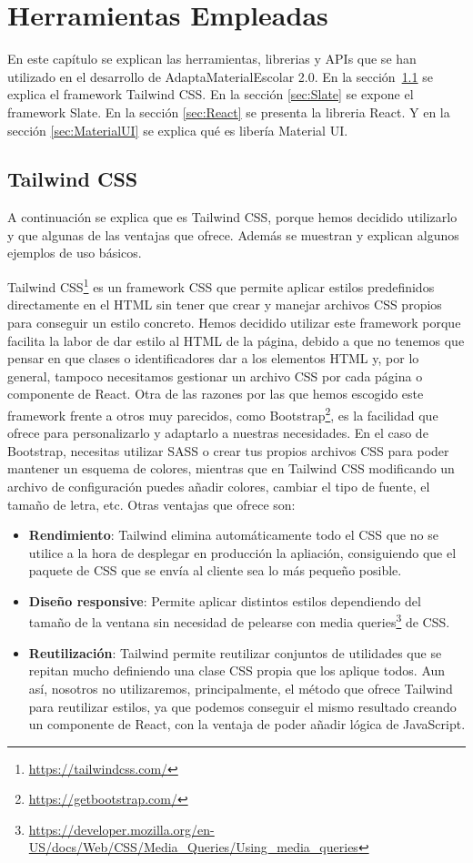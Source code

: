 \chapter{Herramientas Empleadas}\label{ch:herramientas}

En este capítulo se explican las herramientas, librerias y APIs que se han utilizado en el desarrollo de AdaptaMaterialEscolar 2.0. En la sección~\ref{sec:tailwind} se explica el framework Tailwind CSS. En la sección \ref{sec:Slate} se expone el framework Slate. En la sección \ref{sec:React} se presenta la libreria React. Y en la sección \ref{sec:MaterialUI} se explica qué es libería Material UI.

\section{Tailwind CSS}\label{sec:tailwind}
A continuación se explica que es Tailwind CSS, porque hemos decidido utilizarlo y que algunas de las ventajas que ofrece. Además se muestran y explican algunos ejemplos de uso básicos.

Tailwind CSS\footnote{\url{https://tailwindcss.com/}} es un framework CSS que permite aplicar estilos predefinidos directamente en el HTML sin tener que crear y manejar archivos CSS propios para conseguir un estilo concreto. Hemos decidido utilizar este framework porque facilita la labor de dar estilo al HTML de la página, debido a que no tenemos que pensar en que clases o identificadores dar a los elementos HTML y, por lo general, tampoco necesitamos gestionar un archivo CSS por cada página o componente de React. Otra de las razones por las que hemos escogido este framework frente a otros muy parecidos, como Bootstrap\footnote{\url{https://getbootstrap.com/}}, es la facilidad que ofrece para personalizarlo y adaptarlo a nuestras necesidades. En el caso de Bootstrap, necesitas utilizar SASS o crear tus propios archivos CSS para poder mantener un esquema de colores, mientras que en Tailwind CSS modificando un archivo de configuración puedes añadir colores, cambiar el tipo de fuente, el tamaño de letra, etc. Otras ventajas que ofrece son:
\begin{itemize}
    \item \textbf{Rendimiento}: Tailwind elimina automáticamente todo el CSS que no se utilice a la hora de desplegar en producción la apliación, consiguiendo que el paquete de CSS que se envía al cliente sea lo más pequeño posible.
    \item \textbf{Diseño responsive}: Permite aplicar distintos estilos dependiendo del tamaño de la ventana sin necesidad de pelearse con media queries\footnote{\url{https://developer.mozilla.org/en-US/docs/Web/CSS/Media_Queries/Using_media_queries}} de CSS.
    \item \textbf{Reutilización}: Tailwind permite reutilizar conjuntos de utilidades que se repitan mucho definiendo una clase CSS propia que los aplique todos. Aun así, nosotros no utilizaremos, principalmente, el método que ofrece Tailwind para reutilizar estilos, ya que podemos conseguir el mismo resultado creando un componente de React, con la ventaja de poder añadir lógica de JavaScript.
\end{itemize}

